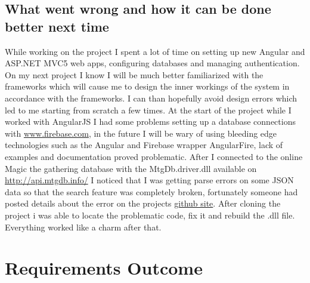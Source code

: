 \documentclass[paper=a4, fontsize=11pt]{scrartcl} %
\numberwithin{equation}{section} %
\numberwithin{figure}{section} %
\numberwithin{table}{section} %
\begin{document}
\clearpage

\subsection{What went wrong and how it can be done better next time
}
While working on the project I spent a lot of time on setting up new Angular and ASP.NET MVC5 web apps, configuring databases and managing authentication. On my next project I know I will be much better familiarized with the frameworks which will cause me to design the inner workings of the system in accordance with the frameworks. I can than hopefully avoid design errors which led to me starting from scratch a few times.
At the start of the project while I worked with AngularJS I had some problems setting up a database connections with \href{http://www.firebase.com}{www.firebase.com}, in the future I will be wary of using bleeding edge technologies such as the Angular and Firebase wrapper AngularFire, lack of examples and documentation proved problematic.
After I connected to the online Magic the gathering database with the MtgDb.driver.dll available on \href{http://api.mtgdb.info/}{http://api.mtgdb.info/} I noticed that I was getting parse errors on some JSON data so that the search feature was completely broken, fortunately someone had posted details about the error on the projects \href{https://github.com/planeswalkers/CSharpMtgDb.Info}{github site}. After cloning the project i was able to locate the problematic code, fix it and rebuild the .dll file. Everything worked like a charm after that.

\section{Requirements Outcome}
\begin{center}
\end{center}
\begin{center}
\end{center}
\clearpage
\end{document}
